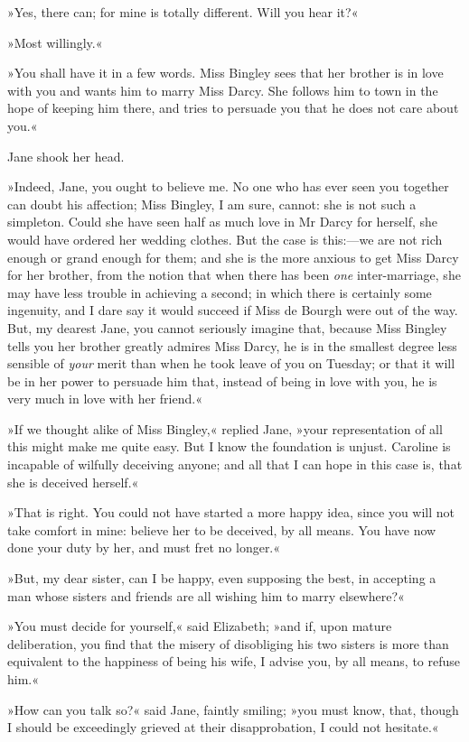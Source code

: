 »Yes, there can; for mine is totally different. Will you hear it?«

»Most willingly.«

»You shall have it in a few words. Miss Bingley sees that her brother is in love with you and wants him to marry Miss Darcy. She follows him to town in the hope of keeping him there, and tries to persuade you that he does not care about you.«

Jane shook her head.

»Indeed, Jane, you ought to believe me. No one who has ever seen you together can doubt his affection; Miss Bingley, I am sure, cannot: she is not such a simpleton. Could she have seen half as much love in Mr Darcy for herself, she would have ordered her wedding clothes. But the case is this:—we are not rich enough or grand enough for them; and she is the more anxious to get Miss Darcy for her brother, from the notion that when there has been \textit{one} inter-marriage, she may have less trouble in achieving a second; in which there is certainly some ingenuity, and I dare say it would succeed if Miss de Bourgh were out of the way. But, my dearest Jane, you cannot seriously imagine that, because Miss Bingley tells you her brother greatly admires Miss Darcy, he is in the smallest degree less sensible of \textit{your} merit than when he took leave of you on Tuesday; or that it will be in her power to persuade him that, instead of being in love with you, he is very much in love with her friend.«

»If we thought alike of Miss Bingley,« replied Jane, »your representation of all this might make me quite easy. But I know the foundation is unjust. Caroline is incapable of wilfully deceiving anyone; and all that I can hope in this case is, that she is deceived herself.«

»That is right. You could not have started a more happy idea, since you will not take comfort in mine: believe her to be deceived, by all means. You have now done your duty by her, and must fret no longer.«

»But, my dear sister, can I be happy, even supposing the best, in accepting a man whose sisters and friends are all wishing him to marry elsewhere?«

»You must decide for yourself,« said Elizabeth; »and if, upon mature deliberation, you find that the misery of disobliging his two sisters is more than equivalent to the happiness of being his wife, I advise you, by all means, to refuse him.«

»How can you talk so?« said Jane, faintly smiling; »you must know, that, though I should be exceedingly grieved at their disapprobation, I could not hesitate.«

